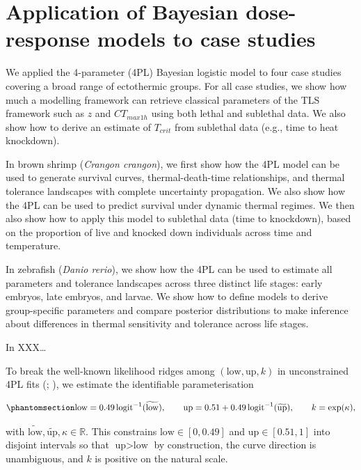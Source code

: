 \documentclass[
  11pt,
]{article}
\begin{document}
\section{Application of Bayesian dose-response models to case
studies}\label{application-of-bayesian-dose-response-models-to-case-studies}

We applied the 4-parameter (4PL) Bayesian logistic model to four case
studies covering a broad range of ectothermic groups. For all case
studies, we show how much a modelling framework can retrieve classical
parameters of the TLS framework such as \(z\) and \(CT_{max1h}\) using
both lethal and sublethal data. We also show how to derive an estimate
of \(T_{crit}\) from sublethal data (e.g., time to heat knockdown).

In brown shrimp (\emph{Crangon crangon}), we first show how the 4PL
model can be used to generate survival curves, thermal-death-time
relationships, and thermal tolerance landscapes with complete
uncertainty propagation. We also show how the 4PL can be used to predict
survival under dynamic thermal regimes. We then also show how to apply
this model to sublethal data (time to knockdown), based on the
proportion of live and knocked down individuals across time and
temperature.

In zebrafish (\emph{Danio rerio}), we show how the 4PL can be used to
estimate all parameters and tolerance landscapes across three distinct
life stages: early embryos, late embryos, and larvae. We show how to
define models to derive group-specific parameters and compare posterior
distributions to make inference about differences in thermal sensitivity
and tolerance across life stages.

In XXX\ldots{}

To break the well-known likelihood ridges among
\((\text{low}, \text{up}, k)\) in unconstrained 4PL fits
(;
), we estimate the
identifiable parameterisation

\begin{equation}\phantomsection\label{eq-reparam}{
\text{low} = 0.49\,\text{logit}^{-1}(\widetilde{\text{low}}), \qquad
\text{up}   = 0.51 + 0.49\,\text{logit}^{-1}(\widetilde{\text{up}}), \qquad
k   = \exp(\kappa),
}\end{equation}

with
\(\widetilde{\text{low}},\widetilde{\text{up}},\kappa \in \mathbb{R}\).
This constrains \(\text{low} \in [0, 0.49]\) and
\(\text{up} \in [0.51, 1]\) into disjoint intervals so that
\(\text{up} > \text{low}\) by construction, the curve direction is
unambiguous, and \(k\) is positive on the natural scale.
\end{document}
